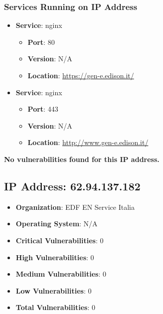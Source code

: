 \documentclass{article}
\begin{document}
\subsubsection*{Services Running on IP Address}

\begin{itemize}
    
        \item \textbf{Service}: nginx
        \begin{itemize}
            \item \textbf{Port}: 80
            \item \textbf{Version}:  N/A 
            \item \textbf{Location}: \href{ https://gen-e.edison.it/ }{ https://gen-e.edison.it/ }
        \end{itemize}
    
        \item \textbf{Service}: nginx
        \begin{itemize}
            \item \textbf{Port}: 443
            \item \textbf{Version}:  N/A 
            \item \textbf{Location}: \href{ http://www.gen-e.edison.it/ }{ http://www.gen-e.edison.it/ }
        \end{itemize}
    
\end{itemize}


\textbf{No vulnerabilities found for this IP address.}




\clearpage



\subsection*{IP Address: 62.94.137.182}

\begin{itemize}
    \item \textbf{Organization}: EDF EN Service Italia
    \item \textbf{Operating System}:  N/A 
    \item \textbf{Critical Vulnerabilities}: 0
    \item \textbf{High Vulnerabilities}: 0
    \item \textbf{Medium Vulnerabilities}: 0
    \item \textbf{Low Vulnerabilities}: 0
    \item \textbf{Total Vulnerabilities}: 0
\end{itemize}
\end{document}
